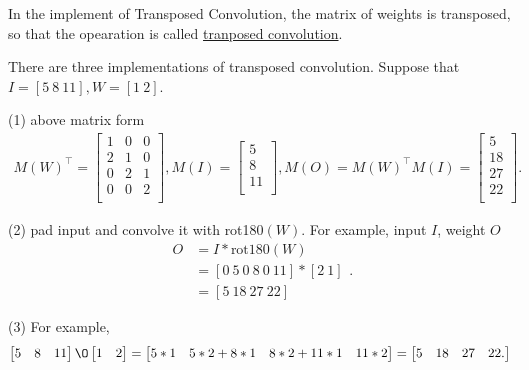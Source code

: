 \documentclass[10pt,onecolumn]{book}
\begin{document}
In the implement of Transposed Convolution, the matrix of weights is transposed, so that the opearation is called \uline{tranposed convolution}.

There are three implementations of transposed convolution. Suppose that $I = [5 \ 8 \ 11], W = [1 \ 2]$.

(1) above matrix form 
\begin{equation}
\begin{split}
M(W)^\top = \left[
	\begin{matrix}
	1 & 0 & 0 \\
	2 & 1 & 0 \\
	0 & 2 & 1 \\
	0 & 0 & 2 \\
	\end{matrix}
\right],
M(I) = \left[
	\begin{matrix}
	5 \\
	8 \\
	11 \\
	\end{matrix}
\right],
M(O) = M(W)^\top M(I) = \left[
	\begin{matrix}
	5 \\
	18 \\
	27 \\
	22 \\
	\end{matrix}
\right].
\end{split}
\end{equation}

(2) pad input and convolve it with rot180$(W)$. For example, input $I$, weight $O$
\begin{equation}
\begin{split}
O & = I * \text{rot180}(W) \\
	&= [0 \ 5 \ 0 \ 8 \ 0 \ 11] * [2 \ 1] \\
	& = [5 \ 18 \ 27 \ 22] 
\end{split}.
\end{equation}

(3) For example,
\begin{equation}
\begin{split}
	\left[
	\begin{matrix}
	5 & 8 & 11
	\end{matrix}
\right] \O  \left[
	\begin{matrix}
	1 & 2
	\end{matrix}
\right] = \left[
	\begin{matrix}
	5*1 & 5*2 + 8*1 & 8*2 + 11*1 & 11 *2
	\end{matrix}
\right] = \left[
	\begin{matrix}
	5 & 18 & 27 & 22
	\end{matrix}.
\right] 
\end{split}
\end{equation}
\end{document}
